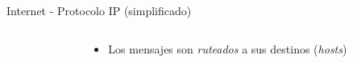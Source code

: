 \begin{frame}[fragile]{Internet - Protocolo IP (simplificado)}
   \begin{columns}
       \begin{column}{.4\linewidth}
       \end{column}
      \begin{column}{.6\linewidth}
        \begin{itemize}
            \item<1-> Los mensajes son \textit{ruteados} a sus destinos (\textit{hosts})

\end{itemize}
\end{column}
\end{columns}
\end{frame}

